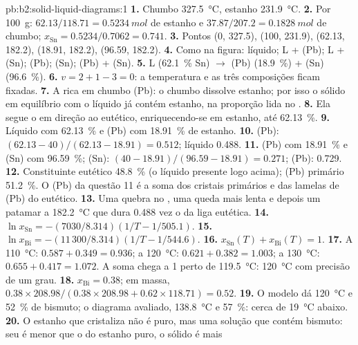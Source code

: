 \begin{solution}{pb:b2:solid-liquid-diagrams:1}
\textbf{1.} Chumbo \qty{327.5}{\degreeCelsius}, estanho \qty{231.9}{\degreeCelsius}.
\textbf{2.} Por \qty{100}{g}: $62.13/118.71 = \qty{0.5234}{mol}$ de estanho e
$37.87/207.2 = \qty{0.1828}{mol}$ de chumbo; $x_{\mathrm{Sn}} = 0.5234/0.7062 =
0.741$.
\textbf{3.} Pontos (0, 327.5), (100, 231.9), (62.13, 182.2), (18.91, 182.2),
(96.59, 182.2).
\textbf{4.} Como na figura: líquido; L + (Pb); L + (Sn); (Pb); (Sn); (Pb) + (Sn).
\textbf{5.} L (62.1~\% Sn) $\longrightarrow$ (Pb) (18.9~\%) + (Sn) (96.6~\%).
\textbf{6.} $v = 2 + 1 - 3 = 0$: a temperatura e as três composições ficam
fixadas.
\textbf{7.} A  rica em chumbo (Pb): o chumbo dissolve estanho;
por isso o sólido em equilíbrio com o líquido já contém estanho, na
proporção lida no .
\textbf{8.} Ela segue o  em direção ao eutético, enriquecendo-se em
estanho, até 62.13~\%.
\textbf{9.} Líquido com 62.13~\% e (Pb) com 18.91~\% de estanho.
\textbf{10.} (Pb): $(62.13 - 40)/(62.13 - 18.91) = 0.512$; líquido 0.488.
\textbf{11.} (Pb) com 18.91~\% e (Sn) com 96.59~\%; (Sn): $(40 - 18.91)/(96.59 -
18.91) = 0.271$; (Pb): 0.729.
\textbf{12.} Constituinte eutético 48.8~\% (o líquido presente logo acima);
(Pb) primário 51.2~\%. O (Pb) da questão 11 é a soma dos cristais primários
e das lamelas de (Pb) do eutético.
\textbf{13.} Uma quebra no , uma queda mais lenta e depois um patamar a
\qty{182.2}{\degreeCelsius} que dura 0.488 vez o da liga eutética.
\textbf{14.} $\ln x_{\mathrm{Sn}} = -(7030/8.314)(1/T - 1/505.1)$.
\textbf{15.} $\ln x_{\mathrm{Bi}} = -(11\,300/8.314)(1/T - 1/544.6)$.
\textbf{16.} $x_{\mathrm{Sn}}(T) + x_{\mathrm{Bi}}(T) = 1$.
\textbf{17.} A \qty{110}{\degreeCelsius}: $0.587 + 0.349 = 0.936$; a
\qty{120}{\degreeCelsius}: $0.621 + 0.382 = 1.003$; a
\qty{130}{\degreeCelsius}: $0.655 + 0.417 = 1.072$. A soma chega a 1 perto de
\qty{119.5}{\degreeCelsius}: \qty{120}{\degreeCelsius} com precisão de um grau.
\textbf{18.} $x_{\mathrm{Bi}} = 0.38$; em massa, $0.38 \times 208.98/(0.38 \times
208.98 + 0.62 \times 118.71) = 0.52$.
\textbf{19.} O modelo dá \qty{120}{\degreeCelsius} e 52~\% de bismuto; o
diagrama avaliado, \qty{138.8}{\degreeCelsius} e 57~\%: cerca de
\qty{19}{\degreeCelsius} abaixo.
\textbf{20.} O estanho que cristaliza não é puro, mas uma solução que contém
bismuto: seu  é menor que o do estanho puro, o sólido é mais

\end{solution}
